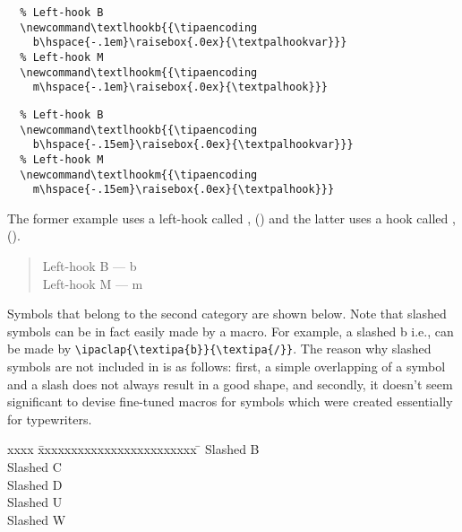 \iftimes
\newcommand\textlhookb{{\tipaencoding
  b\hspace{-.1em}\raisebox{.0ex}{\textpalhookvar}}}
\newcommand\textlhookm{{\tipaencoding
  m\hspace{-.1em}\raisebox{.0ex}{\textpalhook}}}
\begin{verbatim}
  % Left-hook B
  \newcommand\textlhookb{{\tipaencoding
    b\hspace{-.1em}\raisebox{.0ex}{\textpalhookvar}}}
  % Left-hook M
  \newcommand\textlhookm{{\tipaencoding
    m\hspace{-.1em}\raisebox{.0ex}{\textpalhook}}}
\end{verbatim}
\else
\newcommand\textlhookb{{\tipaencoding
  b\hspace{-.15em}\raisebox{.0ex}{\textpalhookvar}}}
\newcommand\textlhookm{{\tipaencoding
  m\hspace{-.15em}\raisebox{.0ex}{\textpalhook}}}
\begin{verbatim}
  % Left-hook B
  \newcommand\textlhookb{{\tipaencoding
    b\hspace{-.15em}\raisebox{.0ex}{\textpalhookvar}}}
  % Left-hook M
  \newcommand\textlhookm{{\tipaencoding
    m\hspace{-.15em}\raisebox{.0ex}{\textpalhook}}}
\end{verbatim}
\fi

The former example uses a left-hook called ,
(\KK\textpalhookvar\KK) and the latter uses a hook called ,
(\KK\textpalhook\KK).

\begin{quote}
  Left-hook B --- \textlhookb \\
  Left-hook M --- \textlhookm
\end{quote}

Symbols that belong to the second category are shown below. Note that
slashed symbols can be in fact easily made by a macro. For example, a
slashed b i.e.,  can be made by
\verb|\ipaclap{\textipa{b}}{\textipa{/}}|. The reason why slashed
symbols are not included in \tipa{} is as follows: first, a simple
overlapping of a symbol and a slash does not always result in a good
shape, and secondly, it doesn't seem significant to devise fine-tuned
macros for symbols which were created essentially for typewriters.

\medskip
\begin{tabbing}
xxxx \=xxxxxxxxxxxxxxxxxxxxxxxx \= \kill
\> Slashed B \>
   \\
\> Slashed C \>
   \\
\> Slashed D \>
   \\
\> Slashed U \>
   \\
\> Slashed W \>
\end{tabbing}

